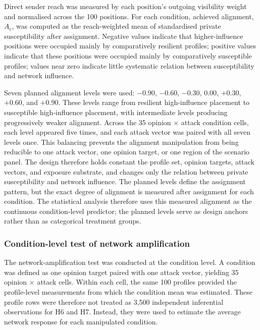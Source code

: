\documentclass[11pt,a4paper]{article}
\begin{document}
Direct sender reach was measured by each position's outgoing visibility weight and normalised
across the 100 positions. For each condition, achieved alignment, \(A_c\), was computed as the
reach-weighted mean of standardised private susceptibility after assignment. Negative values
indicate that higher-influence positions were occupied mainly by comparatively resilient profiles;
positive values indicate that these positions were occupied mainly by comparatively susceptible
profiles; values near zero indicate little systematic relation between susceptibility and network
influence.

Seven planned alignment levels were used: \(-0.90\), \(-0.60\), \(-0.30\), \(0.00\), \(+0.30\),
\(+0.60\), and \(+0.90\). These levels range from resilient high-influence placement to susceptible
high-influence placement, with intermediate levels producing progressively weaker alignment.
Across the 35 opinion $\times$ attack condition cells, each level appeared five times, and each
attack vector was paired with all seven levels once. This balancing prevents the alignment
manipulation from being reducible to one attack vector, one opinion target, or one region of the
scenario panel. The design therefore holds constant the profile set, opinion targets, attack
vectors, and exposure substrate, and changes only the relation between private susceptibility and
network influence. The planned levels define the assignment pattern, but the exact degree of
alignment is measured after assignment for each condition. The statistical analysis therefore uses
this measured alignment as the continuous condition-level predictor; the planned levels serve as
design anchors rather than as categorical treatment groups.

\subsubsection{Condition-level test of network amplification}

The network-amplification test was conducted at the condition level. A condition was defined as
one opinion target paired with one attack vector, yielding 35 opinion $\times$ attack cells. Within
each cell, the same 100 profiles provided the profile-level measurements from which the condition
mean was estimated. These profile rows were therefore not treated as 3,500 independent inferential
observations for H6 and H7. Instead, they were used to estimate the average network response for
each manipulated condition.
\end{document}

